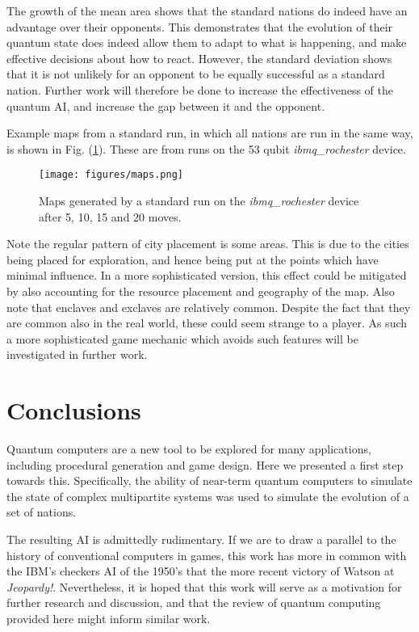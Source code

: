 \documentclass[conference]{IEEEtran}
\begin{document}
The growth of the mean area shows that the standard nations do indeed have an advantage over their opponents. This demonstrates that the evolution of their quantum state does indeed allow them to adapt to what is happening, and make effective decisions about how to react. However, the standard deviation shows that it is not unlikely for an opponent to be equally successful as a standard nation. Further work will therefore be done to increase the effectiveness of the quantum AI, and increase the gap between it and the opponent.

Example maps from a standard run, in which all nations are run in the same way, is shown in Fig. (\ref{maps}). These are from runs on the 53 qubit \textit{ibmq\_rochester} device.

\begin{figure}[htbp]
\begin{center}
\texttt{[image: figures/maps.png]}
\caption{Maps generated by a standard run on the \textit{ibmq\_rochester} device after 5, 10, 15 and 20 moves.}
\label{maps}
\end{center}
\end{figure}

Note the regular pattern of city placement is some areas. This is due to the cities being placed for exploration, and hence being put at the points which have minimal influence. In a more sophisticated version, this effect could be mitigated by also accounting for the resource placement and geography of the map. Also note that enclaves and exclaves are relatively common. Despite the fact that they are common also in the real world, these could seem strange to a player. As such a more sophisticated game mechanic which avoids such features will be investigated in further work.

\section{Conclusions}

Quantum computers are a new tool to be explored for many applications, including procedural generation and game design. Here we presented a first step towards this. Specifically, the ability of near-term quantum computers to simulate the state of complex multipartite systems was used to simulate the evolution of a set of nations.

The resulting AI is admittedly rudimentary. If we are to draw a parallel to the history of conventional computers in games, this work has more in common with the IBM's checkers AI of the 1950's that the more recent victory of Watson at \textit{Jeopardy!}. Nevertheless, it is hoped that this work will serve as a motivation for further research and discussion, and that the review of quantum computing provided here might inform similar work.
\end{document}
